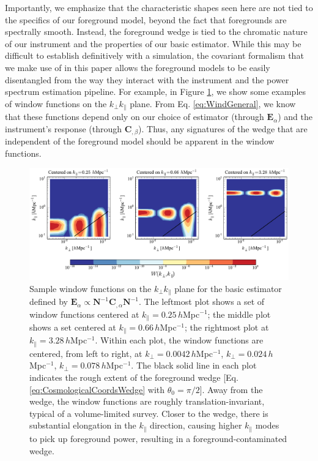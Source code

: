 \documentclass[twocolumn,aps,prd,nofootinbib,showpacs]{revtex4-1}
\begin{document}
Importantly, we emphasize that the characteristic shapes seen here are not tied to the specifics of our foreground model, beyond the fact that foregrounds are spectrally smooth.  Instead, the foreground wedge is tied to the chromatic nature of our instrument and the properties of our basic estimator.  While this may be difficult to establish definitively with a simulation, the covariant formalism that we make use of in this paper allows the foreground models to be easily disentangled from the way they interact with the instrument and the power spectrum estimation pipeline.  For example, in Figure \ref{fig:basicEstWindows}, we show some examples of window functions on the $k_\perp k_\parallel$ plane.  From  Eq. \eqref{eq:WindGeneral}, we know that these functions depend only on our choice of estimator (through $\mathbf{E}_\alpha$) and the instrument's response (through $\mathbf{C}_{,\beta}$).  Thus, any signatures of the wedge that are independent of the foreground model should be apparent in the window functions.

\begin{figure}[!ht] 
	\centering 
	\includegraphics[width=1\textwidth]{simpleEstWindCollection.pdf}
	\caption{Sample window functions on the $k_\perp k_\parallel$ plane for the basic estimator defined by $\mathbf{E}_\alpha \propto \mathbf{N}^{-1} \mathbf{C}_{,\alpha} \mathbf{N}^{-1}$.  The leftmost plot shows a set of window functions centered at $k_\parallel = 0.25\,h$Mpc$^{-1}$; the middle plot shows a set centered at $k_\parallel = 0.66\,h$Mpc$^{-1}$; the rightmost plot at $k_\parallel = 3.28\,h$Mpc$^{-1}$.  Within each plot, the window functions are centered, from left to right, at $k_\perp = 0.0042\,h$Mpc$^{-1}$, $k_\perp = 0.024\,h$Mpc$^{-1}$, $k_\perp = 0.078\,h$Mpc$^{-1}$.  The black solid line in each plot indicates the rough extent of the foreground wedge [Eq. \eqref{eq:CosmologicalCoordsWedge} with $\theta_0 = \pi / 2$].  Away from the wedge, the window functions are roughly translation-invariant, typical of a volume-limited survey.  Closer to the wedge, there is substantial elongation in the $k_\parallel$ direction, causing higher $k_\parallel$ modes to pick up foreground power, resulting in a foreground-contaminated wedge.}
	\label{fig:basicEstWindows}
\end{figure}
\end{document}
